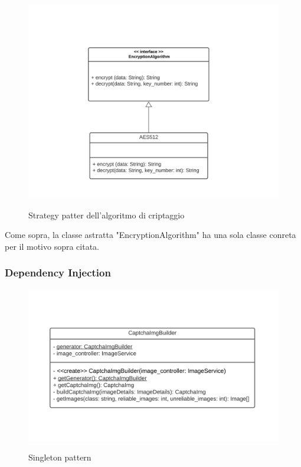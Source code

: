 \begin{figure}[H]
    \centering
    \includegraphics[scale = 1.0]{img/criptStrategy.png}\\
    \caption{Strategy patter dell'algoritmo di criptaggio}
\end{figure}

Come sopra, la classe astratta "EncryptionAlgorithm" ha una sola classe conreta per il motivo sopra citata.

\subsubsection{Dependency Injection}

\begin{figure}[H]
    \centering
    \includegraphics[scale = 1.0]{img/singleton.png}\\
    \caption{Singleton pattern}
\end{figure}

